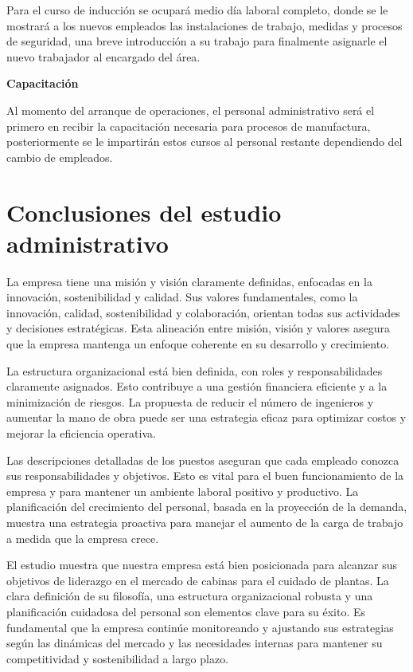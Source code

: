 Para el curso de inducción se ocupará medio día laboral completo, donde se le mostrará a los nuevos empleados las instalaciones de trabajo, medidas y procesos de seguridad, una breve introducción a su trabajo para finalmente asignarle el nuevo trabajador al encargado del área.

\textbf{Capacitación}

Al momento del arranque de operaciones, el personal administrativo será el primero en recibir la capacitación necesaria para procesos de manufactura, posteriormente se le impartirán estos cursos al personal restante dependiendo del cambio de empleados.

\section{Conclusiones del estudio administrativo}

La empresa tiene una misión y visión claramente definidas, enfocadas en la innovación, sostenibilidad y calidad. Sus valores fundamentales, como la innovación, calidad, sostenibilidad y colaboración, orientan todas sus actividades y decisiones estratégicas. Esta alineación entre misión, visión y valores asegura que la empresa mantenga un enfoque coherente en su desarrollo y crecimiento.

La estructura organizacional está bien definida, con roles y responsabilidades claramente asignados. Esto contribuye a una gestión financiera eficiente y a la minimización de riesgos. La propuesta de reducir el número de ingenieros y aumentar la mano de obra puede ser una estrategia eficaz para optimizar costos y mejorar la eficiencia operativa.

Las descripciones detalladas de los puestos aseguran que cada empleado conozca sus responsabilidades y objetivos. Esto es vital para el buen funcionamiento de la empresa y para mantener un ambiente laboral positivo y productivo. La planificación del crecimiento del personal, basada en la proyección de la demanda, muestra una estrategia proactiva para manejar el aumento de la carga de trabajo a medida que la empresa crece.

El estudio muestra que nuestra   empresa está bien posicionada para alcanzar sus objetivos de liderazgo en el mercado de cabinas para el cuidado de plantas. La clara definición de su filosofía, una estructura organizacional robusta y una planificación cuidadosa del personal son elementos clave para su éxito. Es fundamental que la empresa continúe monitoreando y ajustando sus estrategias según las dinámicas del mercado y las necesidades internas para mantener su competitividad y sostenibilidad a largo plazo.


